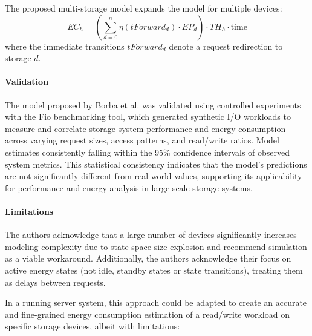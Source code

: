 The proposed multi-storage model expands the model for multiple devices:
\begin{equation}
    EC_h = \left( \sum_{d=0}^{n} \eta(tForward_d) \cdot EP_d \right) \cdot TH_h \cdot \text{time}
\end{equation}
where the immediate transitions $tForward_d$ denote a request redirection to storage $d$.

\paragraph{Validation}
The model proposed by Borba et al. was validated using controlled experiments with the Fio benchmarking tool, which generated synthetic I/O workloads to measure and correlate storage system performance and energy consumption across varying request sizes, access patterns, and read/write ratios. Model estimates consistently falling within the 95\% confidence intervals of observed system metrics. This statistical consistency indicates that the model's predictions are not significantly different from real-world values, supporting its applicability for performance and energy analysis in large-scale storage systems.

\paragraph{Limitations}
The authors acknowledge that a large number of devices significantly increases modeling complexity due to state space size explosion and recommend simulation as a viable workaround. Additionally, the authors acknowledge their focus on active energy states (not idle, standby states or state transitions), treating them as delays between requests. 

In a running server system, this approach could be adapted to create an accurate and fine-grained energy consumption estimation of a read/write workload on specific storage devices, albeit with limitations:

